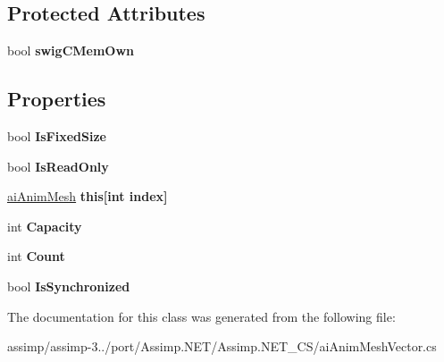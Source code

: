 \subsection*{Protected Attributes}
\begin{DoxyCompactItemize}
\item 
\hypertarget{classai_anim_mesh_vector_a47c000190b937820793d6038887d858e}{bool {\bfseries swig\+C\+Mem\+Own}}\label{classai_anim_mesh_vector_a47c000190b937820793d6038887d858e}

\end{DoxyCompactItemize}
\subsection*{Properties}
\begin{DoxyCompactItemize}
\item 
\hypertarget{classai_anim_mesh_vector_adeec17dbfc3059833c46eace5cde6106}{bool {\bfseries Is\+Fixed\+Size}}\label{classai_anim_mesh_vector_adeec17dbfc3059833c46eace5cde6106}

\item 
\hypertarget{classai_anim_mesh_vector_a71c1b72bf568583e65b78f6c9458ceb0}{bool {\bfseries Is\+Read\+Only}}\label{classai_anim_mesh_vector_a71c1b72bf568583e65b78f6c9458ceb0}

\item 
\hypertarget{classai_anim_mesh_vector_ab41b339c54d00e3891b7438aa40dfafd}{\hyperlink{structai_anim_mesh}{ai\+Anim\+Mesh} {\bfseries this\mbox{[}int index\mbox{]}}}\label{classai_anim_mesh_vector_ab41b339c54d00e3891b7438aa40dfafd}

\item 
\hypertarget{classai_anim_mesh_vector_a897ed137b10b9a9b10502416fb2bed94}{int {\bfseries Capacity}}\label{classai_anim_mesh_vector_a897ed137b10b9a9b10502416fb2bed94}

\item 
\hypertarget{classai_anim_mesh_vector_a2a6abf59a660dbce5299d49b987254c2}{int {\bfseries Count}}\label{classai_anim_mesh_vector_a2a6abf59a660dbce5299d49b987254c2}

\item 
\hypertarget{classai_anim_mesh_vector_aca56159424eb78071fc463d85f5b600e}{bool {\bfseries Is\+Synchronized}}\label{classai_anim_mesh_vector_aca56159424eb78071fc463d85f5b600e}

\end{DoxyCompactItemize}


The documentation for this class was generated from the following file\+:\begin{DoxyCompactItemize}
\item 
assimp/assimp-\/3../port/\+Assimp.\+N\+E\+T/\+Assimp.\+N\+E\+T\+\_\+\+C\+S/ai\+Anim\+Mesh\+Vector.\+cs\end{DoxyCompactItemize}
